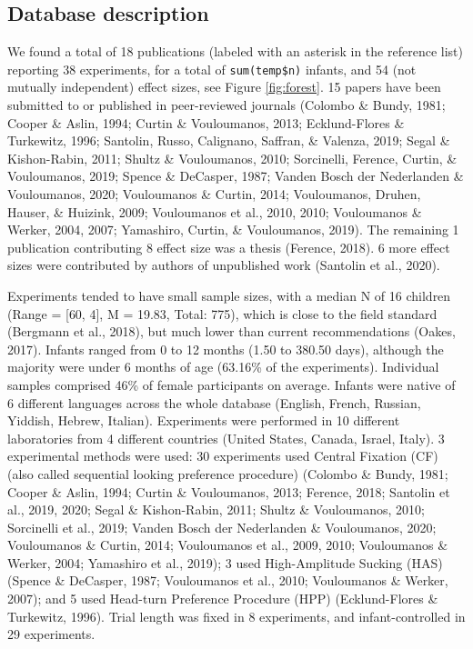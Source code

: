 \documentclass[
  man]{apa6}
\begin{document}
\hypertarget{database-description}{%
\subsection{Database description}\label{database-description}}

We found a total of 18 publications (labeled with an asterisk in the reference list) reporting 38 experiments, for a total of \texttt{sum(temp\$n)} infants, and 54 (not mutually independent) effect sizes, see Figure \ref{fig:forest}. 15 papers have been submitted to or published in peer-reviewed journals (Colombo \& Bundy, 1981; Cooper \& Aslin, 1994; Curtin \& Vouloumanos, 2013; Ecklund-Flores \& Turkewitz, 1996; Santolin, Russo, Calignano, Saffran, \& Valenza, 2019; Segal \& Kishon-Rabin, 2011; Shultz \& Vouloumanos, 2010; Sorcinelli, Ference, Curtin, \& Vouloumanos, 2019; Spence \& DeCasper, 1987; Vanden Bosch der Nederlanden \& Vouloumanos, 2020; Vouloumanos \& Curtin, 2014; Vouloumanos, Druhen, Hauser, \& Huizink, 2009; Vouloumanos et al., 2010, 2010; Vouloumanos \& Werker, 2004, 2007; Yamashiro, Curtin, \& Vouloumanos, 2019). The remaining 1 publication contributing 8 effect size was a thesis (Ference, 2018). 6 more effect sizes were contributed by authors of unpublished work (Santolin et al., 2020).

Experiments tended to have small sample sizes, with a median N of 16 children (Range = {[}60, 4{]}, M = 19.83, Total: 775), which is close to the field standard (Bergmann et al., 2018), but much lower than current recommendations (Oakes, 2017). Infants ranged from 0 to 12 months (1.50 to 380.50 days), although the majority were under 6 months of age (63.16\% of the experiments). Individual samples comprised 46\% of female participants on average. Infants were native of 6 different languages across the whole database (English, French, Russian, Yiddish, Hebrew, Italian).
Experiments were performed in 10 different laboratories from 4 different countries (United States, Canada, Israel, Italy). 3 experimental methods were used: 30 experiments used Central Fixation (CF) (also called sequential looking preference procedure) (Colombo \& Bundy, 1981; Cooper \& Aslin, 1994; Curtin \& Vouloumanos, 2013; Ference, 2018; Santolin et al., 2019, 2020; Segal \& Kishon-Rabin, 2011; Shultz \& Vouloumanos, 2010; Sorcinelli et al., 2019; Vanden Bosch der Nederlanden \& Vouloumanos, 2020; Vouloumanos \& Curtin, 2014; Vouloumanos et al., 2009, 2010; Vouloumanos \& Werker, 2004; Yamashiro et al., 2019); 3 used High-Amplitude Sucking (HAS) (Spence \& DeCasper, 1987; Vouloumanos et al., 2010; Vouloumanos \& Werker, 2007); and 5 used Head-turn Preference Procedure (HPP) (Ecklund-Flores \& Turkewitz, 1996). Trial length was fixed in 8 experiments, and infant-controlled in 29 experiments.
\end{document}
